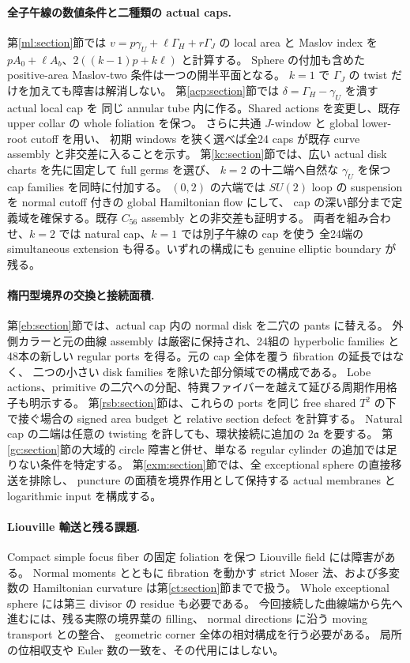 \documentclass[11pt,a4paper]{article}
\theoremstyle{definition}
\begin{document}
\paragraph{全子午線の数値条件と二種類の actual caps.}
第\ref{ml:section}節では $v=p\gamma_U+\ell\Gamma_H+r\Gamma_J$ の local area と Maslov index を
$pA_0+\ell A_b$、$2((k-1)p+k\ell)$ と計算する。
Sphere の付加も含めた positive-area Maslov-two 条件は一つの開半平面となる。
$k=1$ で $\Gamma_J$ の twist だけを加えても障害は解消しない。
第\ref{acp:section}節では $\delta=\Gamma_H-\gamma_U$ を潰す actual local cap を
同じ annular tube 内に作る。Shared actions を変更し、既存 upper collar の whole foliation を保つ。
さらに共通 $J$-window と global lower-root cutoff を用い、
初期 windows を狭く選べば全24 caps が既存 curve assembly と非交差に入ることを示す。
第\ref{kc:section}節では、広い actual disk charts を先に固定して full germs を選び、
$k=2$ の十二端へ自然な $\gamma_U$ を保つ cap families を同時に付加する。
$(0,2)$ の六端では $SU(2)$ loop の suspension を normal cutoff 付きの global Hamiltonian flow にして、
cap の深い部分まで定義域を確保する。既存 $C_{56}$ assembly との非交差も証明する。
両者を組み合わせ、$k=2$ では natural cap、$k=1$ では別子午線の cap を使う
全24端の simultaneous extension も得る。いずれの構成にも genuine elliptic boundary が残る。

\paragraph{楕円型境界の交換と接続面積.}
第\ref{eb:section}節では、actual cap 内の normal disk を二穴の pants に替える。
外側カラーと元の曲線 assembly は厳密に保持され、24組の hyperbolic families と
48本の新しい regular ports を得る。元の cap 全体を覆う fibration の延長ではなく、
二つの小さい disk families を除いた部分領域での構成である。
Lobe actions、primitive の二穴への分配、特異ファイバーを越えて延びる周期作用格子も明示する。
第\ref{rsb:section}節は、これらの ports を同じ free shared $T^2$ の下で接ぐ場合の
signed area budget と relative section defect を計算する。
Natural cap の二端は任意の twisting を許しても、環状接続に追加の $2\mathfrak a$ を要する。
第\ref{gc:section}節の大域的 circle 障害と併せ、単なる regular cylinder の追加では足りない条件を特定する。
第\ref{exm:section}節では、全 exceptional sphere の直接移送を排除し、
puncture の面積を境界作用として保持する actual membranes と logarithmic input を構成する。

\paragraph{Liouville 輸送と残る課題.}
Compact simple focus fiber の固定 foliation を保つ Liouville field には障害がある。
Normal moments とともに fibration を動かす strict Moser 法、および多変数の
Hamiltonian curvature は第\ref{ct:section}節までで扱う。
Whole exceptional sphere には第三 divisor の residue も必要である。
今回接続した曲線端から先へ進むには、残る実際の境界葉の filling、
normal directions に沿う moving transport との整合、
geometric corner 全体の相対構成を行う必要がある。
局所の位相収支や Euler 数の一致を、その代用にはしない。
\end{document}
